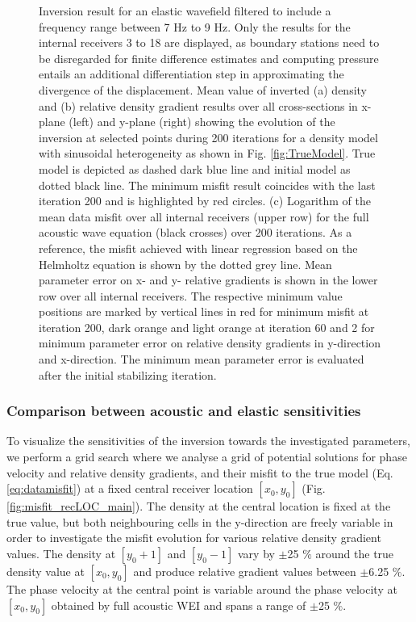 \documentclass[]{article}
\begin{document}
\begin{figure}[H]
\begin{subfigure}[c]{0.65\linewidth}
		\end{subfigure}
		\caption{Inversion result for an elastic wavefield filtered to include a frequency range between 7 Hz to 9 Hz. Only the results for the internal receivers 3 to 18 are displayed, as boundary stations need to be disregarded for finite difference estimates and computing pressure entails an additional differentiation step in approximating the divergence of the displacement. Mean value of inverted (a) density and (b) relative density gradient results over all cross-sections in x-plane (left) and y-plane (right) showing the evolution of the inversion at selected points during 200 iterations for a density model with sinusoidal heterogeneity as shown in Fig. \ref{fig:TrueModel}. True model is depicted as dashed dark blue line and initial model as dotted black line. The minimum misfit result coincides with the last iteration 200 and is highlighted by red circles. (c) Logarithm of the mean data misfit over all internal receivers (upper row) for the full acoustic wave equation (black crosses) over 200 iterations. As a reference, the misfit achieved with linear regression based on the Helmholtz equation is shown by the dotted grey line. Mean parameter error on x- and y- relative gradients is shown in the lower row over all internal receivers. The respective minimum value positions are marked by vertical lines in red for minimum misfit at iteration 200, dark orange and light orange at iteration 60 and 2 for minimum parameter error on relative density gradients in y-direction and x-direction. The minimum mean parameter error is evaluated after the initial stabilizing iteration. }
		\label{fig:el_results}
	\end{figure}
	 
	 \subsubsection{Comparison between acoustic and elastic sensitivities} \label{sec:sensitivities}
	 
	 To visualize the sensitivities of the inversion towards the investigated parameters, we perform a grid search where we analyse a grid of potential solutions for phase velocity and relative density gradients, and their misfit to the true model (Eq. \ref{eq:datamisfit}) at a fixed central receiver location $[x_{0},y_{0}]$ (Fig. \ref{fig:misfit_recLOC_main}). The density at the central location is fixed at the true value, but both neighbouring cells in the y-direction are freely variable in order to investigate the misfit evolution for various relative density gradient values. The density at $[y_{0}+1]$ and $[y_{0}-1]$ vary by $\pm$25 $\%$ around the true density value at $[x_{0},y_{0}]$ and produce relative gradient values between $\pm$6.25 $\%$. The phase velocity at the central point is variable around the phase velocity at $[x_{0},y_{0}]$ obtained by full acoustic WEI and spans a range of $\pm$25 $\%$. \\ %
	 
\end{document}
